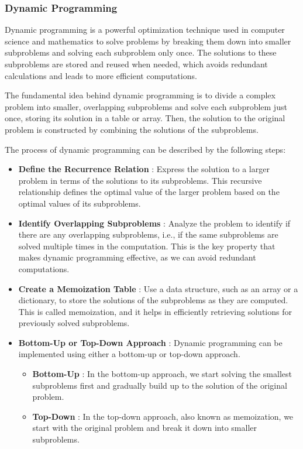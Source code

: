 \subsubsection{Dynamic Programming}


Dynamic programming is a powerful optimization technique used in computer science and mathematics to solve problems by breaking them down into smaller subproblems and solving each subproblem only once. The solutions to these subproblems are stored and reused when needed, which avoids redundant calculations and leads to more efficient computations.

The fundamental idea behind dynamic programming is to divide a complex problem into smaller, overlapping subproblems and solve each subproblem just once, storing its solution in a table or array. Then, the solution to the original problem is constructed by combining the solutions of the subproblems.

The process of dynamic programming can be described by the following steps:

\begin{itemize}
    \item \textbf{Define the Recurrence Relation} : Express the solution to a larger problem in terms of the solutions to its subproblems. This recursive relationship defines the optimal value of the larger problem based on the optimal values of its subproblems.
    \item \textbf{Identify Overlapping Subproblems} : Analyze the problem to identify if there are any overlapping subproblems, i.e., if the same subproblems are solved multiple times in the computation. This is the key property that makes dynamic programming effective, as we can avoid redundant computations.
    \item \textbf{Create a Memoization Table} : Use a data structure, such as an array or a dictionary, to store the solutions of the subproblems as they are computed. This is called memoization, and it helps in efficiently retrieving solutions for previously solved subproblems.
    \item \textbf{Bottom-Up or Top-Down Approach} : Dynamic programming can be implemented using either a bottom-up or top-down approach.
    \begin{itemize}
        \item \textbf{Bottom-Up} : In the bottom-up approach, we start solving the smallest subproblems first and gradually build up to the solution of the original problem.
        \item \textbf{Top-Down} : In the top-down approach, also known as memoization, we start with the original problem and break it down into smaller subproblems.
    \end{itemize}
\end{itemize}


